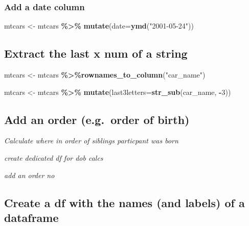 \documentclass[
]{article}
\newenvironment{Shaded}{\begin{snugshade}}{\end{snugshade}}
\newcommand{\AttributeTok}[1]{\textcolor[rgb]{0.13,0.29,0.53}{#1}}
\newcommand{\DecValTok}[1]{\textcolor[rgb]{0.00,0.00,0.81}{#1}}
\newcommand{\FunctionTok}[1]{\textcolor[rgb]{0.13,0.29,0.53}{\textbf{#1}}}
\newcommand{\NormalTok}[1]{#1}
\newcommand{\OtherTok}[1]{\textcolor[rgb]{0.56,0.35,0.01}{#1}}
\newcommand{\SpecialCharTok}[1]{\textcolor[rgb]{0.81,0.36,0.00}{\textbf{#1}}}
\newcommand{\StringTok}[1]{\textcolor[rgb]{0.31,0.60,0.02}{#1}}
\begin{document}
\hypertarget{add-a-date-column}{%
\subsubsection{Add a date column}\label{add-a-date-column}}

\begin{Shaded}
\begin{Highlighting}[]
\NormalTok{mtcars }\OtherTok{\textless{}{-}}\NormalTok{ mtcars }\SpecialCharTok{\%\textgreater{}\%} \FunctionTok{mutate}\NormalTok{(}\AttributeTok{date=}\FunctionTok{ymd}\NormalTok{(}\StringTok{"2001{-}05{-}24"}\NormalTok{))}
\end{Highlighting}
\end{Shaded}

\hypertarget{extract-the-last-x-num-of-a-string}{%
\subsection{Extract the last x num of a string}\label{extract-the-last-x-num-of-a-string}}

\begin{Shaded}
\begin{Highlighting}[]
\NormalTok{mtcars }\OtherTok{\textless{}{-}}\NormalTok{ mtcars }\SpecialCharTok{\%\textgreater{}\%}\FunctionTok{rownames\_to\_column}\NormalTok{(}\StringTok{"car\_name"}\NormalTok{)}

\NormalTok{mtcars }\OtherTok{\textless{}{-}}\NormalTok{ mtcars }\SpecialCharTok{\%\textgreater{}\%} \FunctionTok{mutate}\NormalTok{(}\AttributeTok{last3letters=}\FunctionTok{str\_sub}\NormalTok{(car\_name, }\SpecialCharTok{{-}}\DecValTok{3}\NormalTok{))}
\end{Highlighting}
\end{Shaded}

\hypertarget{add-an-order-e.g.-order-of-birth}{%
\subsection{Add an order (e.g.~order of birth)}\label{add-an-order-e.g.-order-of-birth}}

\emph{Calculate where in order of siblings particpant was born}

\emph{create dedicated df for dob calcs}

\emph{add an order no}

\hypertarget{create-a-df-with-the-names-and-labels-of-a-dataframe}{%
\subsection{Create a df with the names (and labels) of a dataframe}\label{create-a-df-with-the-names-and-labels-of-a-dataframe}}
\end{document}
